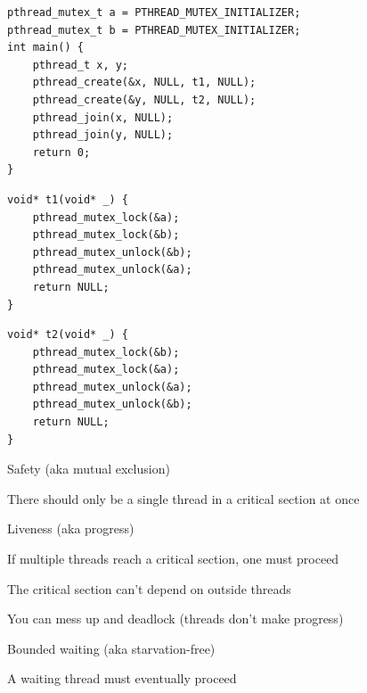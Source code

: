 	\begin{slide}
	
		\vspace{-5mm}
		
\begin{verbatim}
pthread_mutex_t a = PTHREAD_MUTEX_INITIALIZER;
pthread_mutex_t b = PTHREAD_MUTEX_INITIALIZER;
int main() {
    pthread_t x, y;
    pthread_create(&x, NULL, t1, NULL);
    pthread_create(&y, NULL, t2, NULL);
    pthread_join(x, NULL);
    pthread_join(y, NULL);
    return 0;
}
\end{verbatim}
	\medskip
	\begin{minipage}{0.45\textwidth}
	\begin{verbatim}
void* t1(void* _) {
    pthread_mutex_lock(&a);
    pthread_mutex_lock(&b);  
    pthread_mutex_unlock(&b);
    pthread_mutex_unlock(&a);
    return NULL;
}
\end{verbatim}
	\end{minipage}
	\hfill
	\begin{minipage}{0.45\textwidth}
	\begin{verbatim}
void* t2(void* _) {
    pthread_mutex_lock(&b);
    pthread_mutex_lock(&a);  
    pthread_mutex_unlock(&a);
    pthread_mutex_unlock(&b);
    return NULL;
}
\end{verbatim}
	\end{minipage}
	
	\end{slide}

  \begin{slide}


    Safety (aka mutual exclusion)

    \leftspace{}There should only be a single thread in a critical section at
    once
    \medskip

    Liveness (aka progress)

    \leftspace{}If multiple threads reach a critical section, one must proceed

    \leftspace{}The critical section can't depend on outside threads

    \leftspace{}\leftspace{}You can mess up and deadlock (threads don't make progress)
    \medskip

    Bounded waiting (aka starvation-free)

    \leftspace{}A waiting thread must eventually proceed

  \end{slide}

